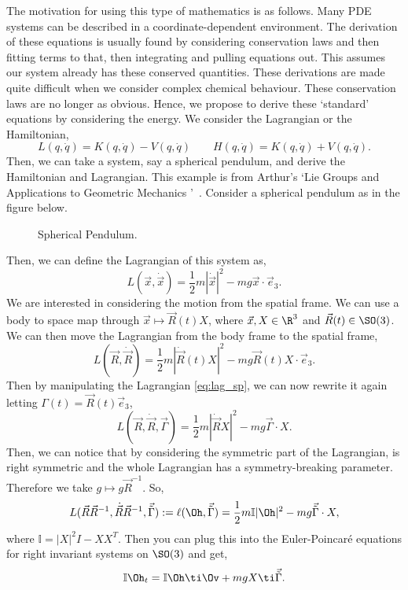 \noindent
The motivation for using this type of mathematics is as follows. Many PDE systems can be described in a coordinate-dependent environment. The derivation of these equations is usually found by considering conservation laws and then fitting terms to that, then integrating and pulling equations out. This assumes our system already has these conserved quantities. These derivations are made quite difficult when we consider complex chemical behaviour. These conservation laws are no longer as obvious. Hence, we propose to derive these `standard' equations by considering the energy. We consider the Lagrangian or the Hamiltonian,
$$ L(q, \dot q) = K(q, \dot q) - V(q, \dot q) \qquad H(q, \dot q) = K(q, \dot q) + V(q, \dot q). $$
Then, we can take a system, say a spherical pendulum, and derive the Hamiltonian and Lagrangian. This example is from Arthur's `Lie Groups and Applications to Geometric Mechanics '~\cite {arthur}. Consider a spherical pendulum as in the figure below.

\begin{figure}[!ht]
\centering
\resizebox{0.6\textwidth}{!}{}
\caption{Spherical Pendulum.}
\label{fig:diffeos}
\end{figure}

\noindent
Then, we can define the Lagrangian of this system as,
$$ L(\vec x, \dot{\vec x}) = \frac{1}{2}m|\dot {\vec x}|^2 - mg \vec x \cdot \vec e_3. $$
We are interested in considering the motion from the spatial frame. We can use a body to space map through $\vec x \mapsto \vec R(t)X$, where $\vec x, X \in \R^3$ and $\vec R(t) \in \SO(3)$. We can then move the Lagrangian from the body frame to the spatial frame,
\begin{equation}
  L(\vec R, \dot{\vec R}) = \frac{1}{2}m|\dot{\vec R}(t)X|^2 - mg \vec R(t)X \cdot \vec e_3.\label{eq:lag_sp}
\end{equation}
Then by manipulating the Lagrangian \eqref{eq:lag_sp}, we can now rewrite it again letting $\Gamma (t) = \vec R(t)\vec e_3$,
$$ L(\vec R, \dot{\vec R}, \vec\Gamma) = \frac{1}{2}m |\dot{\vec R}X|^2 - mg\vec\Gamma \cdot X. $$
Then, we can notice that by considering the symmetric part of the Lagrangian, is right symmetric and the whole Lagrangian has a symmetry-breaking parameter. Therefore we take $g \mapsto g\vec R^{-1}$. So,
$$ L(\vec R\vec R^{-1}, \dot{\vec R}\vec R^{-1}, \vec{\tilde{\Gamma}}) := \ell(\Oh, \vec{\tilde{\Gamma}}) = \frac{1}{2}m \mathbb{I} |\Oh|^2 - mg\vec{\tilde{\Gamma}} \cdot X, $$
where $\mathbb{I} = |X|^2I - XX^T$. Then you can plug this into the Euler-Poincar\'e equations for right invariant systems on $\SO(3)$ and get,
$$ \mathbb{I}\Oh_t = \mathbb{I}\Oh  \ti \Ov + mg X \ti \vec{\tilde{\Gamma}}. $$


